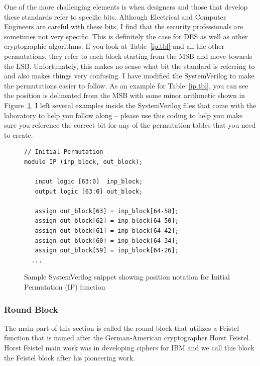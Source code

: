 \documentclass{article}
\begin{document}
One of the more challenging elements is when designers and those that
develop these standards refer to specific bits.  Although Electrical
and Computer Engineers are careful with these bits, I find that the
security professionals are sometimes not very specific.  This is
definitely the case for DES as well as other cryptographic algorithms.
If you look at Table~\ref{ip.tbl} and
all the other permutations, they refer to each block starting from the
MSB and move towards the LSB.  Unfortunately, this makes no sense what
bit the standard is referring to and also makes things very confusing.
I have modified the SystemVerilog to
make the permutations easier to follow.  As an example for 
Table~\ref{ip.tbl}, you can see the position is delineated from the
MSB with some minor arithmetic shown in Figure~\ref{ip.sv}.
I left several examples inside the
SystemVerilog files that come with the laboratory to help you follow
along -- please use this
coding to help you make sure you reference the correct bit for any of
the permutation tables that you need to create.
\begin{figure}
\begin{verbatim}
// Initial Permutation
module IP (inp_block, out_block);

   input logic [63:0]  inp_block;
   output logic [63:0] out_block;

   assign out_block[63] = inp_block[64-58];
   assign out_block[62] = inp_block[64-50];
   assign out_block[61] = inp_block[64-42];
   assign out_block[60] = inp_block[64-34];
   assign out_block[59] = inp_block[64-26];
  ...
\end{verbatim}
\caption{Sample SystemVerilog snippet showing position notation for Initial
  Permutation (IP) function}
\label{ip.sv}
\end{figure}


\subsubsection{Round Block}

The main part of this section is called the round block that utilizes
a Feistel function that is
named after the German-American cryptographer Horst Feistel.  Horst
Feistel main work was in developing ciphers for IBM and we call this
block the Feistel block after his pioneering work.
\end{document}
